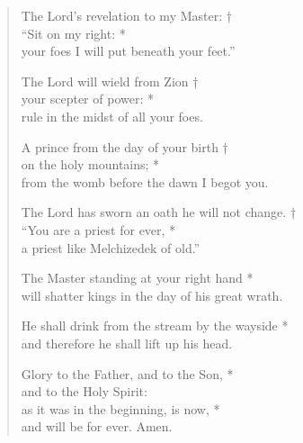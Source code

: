 \documentclass{article}
\begin{document}
\begin{verse}
The Lord’s revelation to my Master: † \\
“Sit on my right: * \\
your foes I will put beneath your feet.”

The Lord will wield from Zion † \\
your scepter of power: *\\
rule in the midst of all your foes.

A prince from the day of your birth † \\
on the holy mountains; * \\
from the womb before the dawn I begot you.

The Lord has sworn an oath he will not change. † \\
“You are a priest for ever, * \\
a priest like Melchizedek of old.”

The Master standing at your right hand * \\
will shatter kings in the day of his great wrath.

He shall drink from the stream by the wayside * \\
and therefore he shall lift up his head. 

Glory to the Father, and to the Son, * \\
and to the Holy Spirit: \\
as it was in the beginning, is now, * \\
and will be for ever. Amen.
\end{verse}
\end{document}
